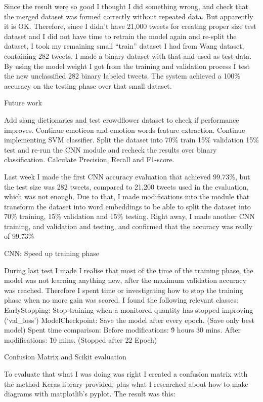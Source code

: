 Since the result were so good I thought I did something wrong, and check that the merged dataset was formed correctly without repeated data. But apparently it is OK. Therefore, since I didn’t have 21,000 tweets for creating proper size test dataset and I did not have time to retrain the model again and re-split the dataset, I took my remaining small “train” dataset I had from Wang dataset, containing 282 tweets. I made a binary dataset with that and used as test data. By using the model weight I got from the training and validation process I test the new unclassified 282 binary labeled tweets. The system achieved a 100\% accuracy on the testing phase over that small dataset.

Future work

Add slang dictionaries and test crowdflower dataset to check if performance improves.
Continue emoticon and emotion words feature extraction.
Continue implementing SVM classifier.
Split the dataset into 70\% train 15\% validation 15\% test and re-run the CNN module and recheck the results over binary classification.
Calculate Precision, Recall and F1-score.

Last week I made the first CNN accuracy evaluation that achieved 99.73\%, but the test size was 282 tweets, compared to 21,200 tweets used in the evaluation, which was not enough.
Due to that, I made modifications into the module that transform the dataset into word embeddings to be able to split the dataset into 70\% training, 15\% validation and 15\% testing.
Right away, I made another CNN training, and validation and testing, and confirmed that the accuracy was really of 99.73\%

CNN: Speed up training phase

During last test I made I realise that most of the time of the training phase, the model was not learning anything new, after the maximum validation accuracy was reached. Therefore I spent time or investigating how to stop the training phase when no more gain was scored. I found the following relevant classes:
EarlyStopping: Stop training when a monitored quantity has stopped improving (‘val\_loss’)
ModelCheckpoint: Save the model after every epoch. (Save only best model)
Spent time comparison:
Before modifications: \~9 hours 30 mins.
After modifications: \~10 mins. (Stopped after 22 Epoch)

Confusion Matrix and Scikit evaluation

To evaluate that what I was doing was right I created a confusion matrix with the method Keras library provided, plus what I researched about how to make diagrams with matplotlib’s pyplot. The result was this:

